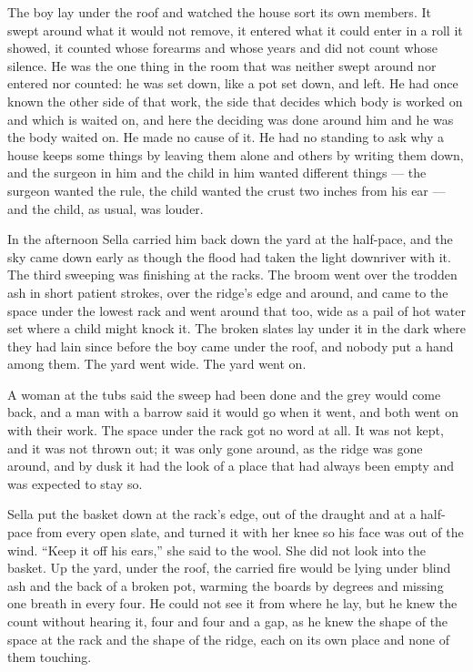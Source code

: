 The boy lay under the roof and watched the house sort its own members. It swept around what it would not remove, it entered what it could enter in a roll it showed, it counted whose forearms and whose years and did not count whose silence. He was the one thing in the room that was neither swept around nor entered nor counted: he was set down, like a pot set down, and left. He had once known the other side of that work, the side that decides which body is worked on and which is waited on, and here the deciding was done around him and he was the body waited on. He made no cause of it. He had no standing to ask why a house keeps some things by leaving them alone and others by writing them down, and the surgeon in him and the child in him wanted different things --- the surgeon wanted the rule, the child wanted the crust two inches from his ear --- and the child, as usual, was louder.

\scenebreak

In the afternoon Sella carried him back down the yard at the half-pace, and the sky came down early as though the flood had taken the light downriver with it. The third sweeping was finishing at the racks. The broom went over the trodden ash in short patient strokes, over the ridge's edge and around, and came to the space under the lowest rack and went around that too, wide as a pail of hot water set where a child might knock it. The broken slates lay under it in the dark where they had lain since before the boy came under the roof, and nobody put a hand among them. The yard went wide. The yard went on.

A woman at the tubs said the sweep had been done and the grey would come back, and a man with a barrow said it would go when it went, and both went on with their work. The space under the rack got no word at all. It was not kept, and it was not thrown out; it was only gone around, as the ridge was gone around, and by dusk it had the look of a place that had always been empty and was expected to stay so.

Sella put the basket down at the rack's edge, out of the draught and at a half-pace from every open slate, and turned it with her knee so his face was out of the wind. “Keep it off his ears,” she said to the wool. She did not look into the basket. Up the yard, under the roof, the carried fire would be lying under blind ash and the back of a broken pot, warming the boards by degrees and missing one breath in every four. He could not see it from where he lay, but he knew the count without hearing it, four and four and a gap, as he knew the shape of the space at the rack and the shape of the ridge, each on its own place and none of them touching.

